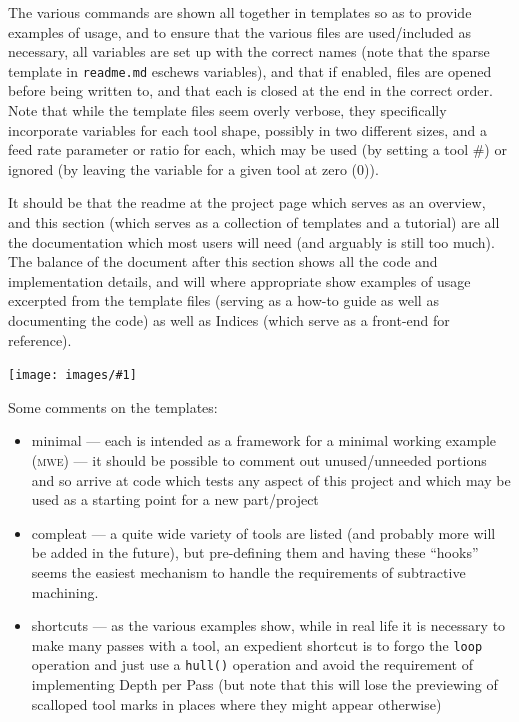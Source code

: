 \documentclass{ltxdoc}
\newcommand{\includeimage}[1]{\bigskip\noindent\texttt{[image: images/\#1]}\bigskip}
\begin{document}
The various commands are shown all together in templates so as to provide examples of usage, and to ensure that the various files are used/included as necessary, all variables are set up with the correct names (note that the sparse template in \verb|readme.md| eschews variables), and that if enabled, files are opened before being written to, and that each is closed at the end in the correct order. Note that while the template files seem overly verbose, they specifically incorporate variables for each tool shape, possibly in two different sizes, and a feed rate parameter or ratio for each, which may be used (by setting a tool \#) or ignored (by leaving the variable for a given tool at zero (0)). 

It should be that the readme at the project page which serves as an overview, and this section (which serves as a collection of templates and a tutorial) are all the documentation which most users will need (and arguably is still too much). The balance of the document after this section shows all the code and implementation details, and will where appropriate show examples of usage excerpted from the template files (serving as a how-to guide as well as documenting the code) as well as Indices (which serve as a front-end for reference).

\includeimage{panorama.pdf}

Some comments on the templates:

\begin{itemize}
\item minimal --- each is intended as a framework for a minimal working example (\textsc{mwe}) --- it should be possible to comment out unused/unneeded portions and so arrive at code which tests any aspect of this project and which may be used as a starting point for a new part/project
\item compleat --- a quite wide variety of tools are listed (and probably more will be added in the future), but pre-defining them and having these ``hooks'' seems the easiest mechanism to handle the requirements of subtractive machining. 
\item shortcuts --- as the various examples show, while in real life it is necessary to 
                    make many passes with a tool, an expedient shortcut is to forgo the 
                    \verb|loop| operation and just use a \verb|hull()| operation and avoid the requirement of implementing 
                    Depth per Pass (but note that this will lose the previewing of scalloped tool 
                    marks in places where they might appear otherwise)
\end{itemize}
\end{document}
